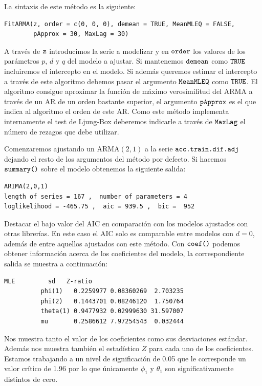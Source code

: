 La sintaxis de este método es la siguiente:
\begin{Verbatim}[fontsize=\footnotesize]
FitARMA(z, order = c(0, 0, 0), demean = TRUE, MeanMLEQ = FALSE,
        pApprox = 30, MaxLag = 30)
\end{Verbatim}

A través de $\verb!z!$ introducimos la serie a modelizar y en $\verb!order!$ los valores de los parámetros $p$, $d$ y $q$ del modelo a ajustar. Si mantenemos $\verb!demean!$ como $\verb!TRUE!$ incluiremos el intercepto en el modelo. Si además queremos estimar el intercepto a través de este algoritmo debemos pasar el argumento $\verb!MeanMLEQ!$ como $\verb!TRUE!$. El algoritmo consigue aproximar la función de máximo verosimilitud del ARMA a través de un AR de un orden bastante superior, el argumento $\verb!pApprox!$ es el que indica al algoritmo el orden de este AR. Como este método implementa internamente el test de Ljung-Box deberemos indicarle a través de $\verb!MaxLag!$ el número de rezagos que debe utilizar.

Comenzaremos ajustando un ARMA$(2,1)$ a la serie $\verb!acc.train.dif.adj!$ dejando el resto de los argumentos del método por defecto. Si hacemos $\verb!summary()!$ sobre el modelo obtenemos la siguiente salida:
\begin{Verbatim}[fontsize=\footnotesize]
ARIMA(2,0,1)
length of series = 167 ,  number of parameters = 4
loglikelihood = -465.75 ,  aic = 939.5 ,  bic =  952
\end{Verbatim}

Destacar el bajo valor del AIC en comparación con los modelos ajustados con otras librerías. En este caso el AIC solo es comparable entre modelos con $d = 0$, además de entre aquellos ajustados con este método. Con $\verb!coef()!$ podemos obtener información acerca de los coeficientes del modelo, la correspondiente salida se muestra a continuación:
\begin{Verbatim}[fontsize=\footnotesize]
                        MLE         sd   Z-ratio
          phi(1)   0.2259977 0.08360269  2.703235
          phi(2)   0.1443701 0.08246120  1.750764
          theta(1) 0.9477932 0.02999630 31.597007
          mu       0.2586612 7.97254543  0.032444
\end{Verbatim}

Nos muestra tanto el valor de los coeficientes como sus desviaciones estándar. Además nos muestra también el estadístico $Z$ para cada uno de los coeficientes. Estamos trabajando a un nivel de significación de 0.05 que le corresponde un valor crítico de 1.96 por lo que únicamente $\phi_1$ y $\theta_1$ son significativamente distintos de cero.

